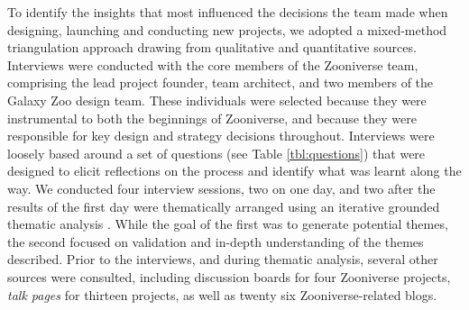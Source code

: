 \documentclass{sigchi}
\begin{document}

To identify the insights that most influenced the decisions the team made when designing, launching and conducting new projects, we adopted a mixed-method triangulation approach \cite{olsen2004triangulation} drawing from qualitative and quantitative sources. Interviews were conducted with the core members of the Zooniverse team, comprising the lead project founder, team architect,  and two members of the Galaxy Zoo design team.  These individuals were selected because they were instrumental to both the beginnings of Zooniverse, and because they were responsible for key design and strategy decisions throughout.  Interviews were loosely based around a set of questions (see Table \ref{tbl:questions}) that were designed to elicit reflections on the process and identify what was learnt along the way.   We conducted four interview sessions, two on one day, and two after the results of the first day were thematically arranged using an iterative grounded thematic analysis \cite{mazzolini2003sage}.  While the goal of the first was to generate potential themes, the second focused on validation and in-depth understanding of the themes described.  Prior to the interviews, and during thematic analysis, several other sources were consulted, including discussion boards for four Zooniverse projects, \emph{talk pages} for thirteen projects, as well as twenty six Zooniverse-related blogs. 


\end{document}
